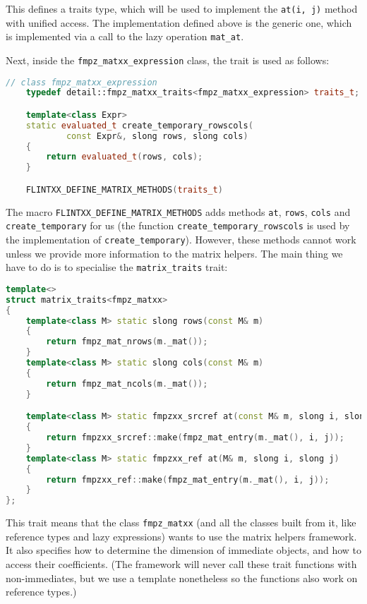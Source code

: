 \documentclass[a4paper,10pt]{book}
\newcommand{\code}{\lstinline}
\begin{document}
{{This defines a traits type, which will be used to implement the
\code{at(i, j)} method with unified access. The implementation defined above is
the generic one, which is implemented via a call to the lazy operation
\code{mat_at}.

Next, inside the
\code{fmpz_matxx_expression} class, the trait is used as follows:

\begin{lstlisting}[language=c++]
// class fmpz_matxx_expression
    typedef detail::fmpz_matxx_traits<fmpz_matxx_expression> traits_t;

    template<class Expr>
    static evaluated_t create_temporary_rowscols(
            const Expr&, slong rows, slong cols)
    {
        return evaluated_t(rows, cols);
    }

    FLINTXX_DEFINE_MATRIX_METHODS(traits_t)
\end{lstlisting}

The macro \code{FLINTXX_DEFINE_MATRIX_METHODS} adds methods \code{at},
\code{rows}, \code{cols} and \code{create_temporary} for us (the function
\code{create_temporary_rowscols} is used by the implementation of
\code{create_temporary}). However, these
methods cannot work unless we provide more information to the matrix helpers.
The main thing we have to do is to specialise the \code{matrix_traits} trait:

\begin{lstlisting}[language=c++]
template<>
struct matrix_traits<fmpz_matxx>
{
    template<class M> static slong rows(const M& m)
    {
        return fmpz_mat_nrows(m._mat());
    }
    template<class M> static slong cols(const M& m)
    {
        return fmpz_mat_ncols(m._mat());
    }

    template<class M> static fmpzxx_srcref at(const M& m, slong i, slong j)
    {
        return fmpzxx_srcref::make(fmpz_mat_entry(m._mat(), i, j));
    }
    template<class M> static fmpzxx_ref at(M& m, slong i, slong j)
    {
        return fmpzxx_ref::make(fmpz_mat_entry(m._mat(), i, j));
    }
};
\end{lstlisting}

This trait means that the class \code{fmpz_matxx} (and all the classes built
from it, like reference types and lazy expressions) wants to use the matrix
helpers framework. It also specifies how to determine the dimension of immediate
objects, and how to access their coefficients. (The framework will never call
these trait functions with non-immediates, but we use a template nonetheless so
the functions also work on reference types.)

}}
\end{document}

